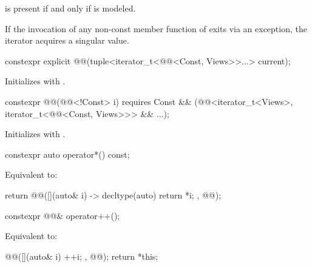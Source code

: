 \pnum
{} is present
if and only if  is modeled.

\pnum
If the invocation of any non-const member function of 
exits via an exception,
the iterator acquires a singular value.

\begin{itemdecl}
constexpr explicit @@(tuple<iterator_t<@@<Const, Views>>...> current);
\end{itemdecl}

\begin{itemdescr}
\pnum
\effects
Initializes  with .
\end{itemdescr}

\begin{itemdecl}
constexpr @@(@@<!Const> i)
  requires Const &&
           (@@<iterator_t<Views>, iterator_t<@@<Const, Views>>> && ...);
\end{itemdecl}

\begin{itemdescr}
\pnum
\effects
Initializes  with .
\end{itemdescr}

\begin{itemdecl}
constexpr auto operator*() const;
\end{itemdecl}

\begin{itemdescr}
\pnum
\effects
Equivalent to:
\begin{codeblock}
return @@([](auto& i) -> decltype(auto) { return *i; }, @@);
\end{codeblock}
\end{itemdescr}

\begin{itemdecl}
constexpr @@& operator++();
\end{itemdecl}

\begin{itemdescr}
\pnum
\effects
Equivalent to:
\begin{codeblock}
@@([](auto& i) { ++i; }, @@);
return *this;
\end{codeblock}
\end{itemdescr}

